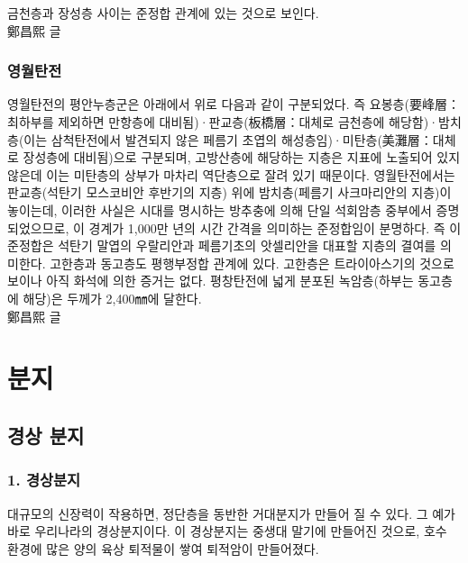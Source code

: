 \documentclass[12pt,a4paper]{book}
\newcommand{\SectionMargin}			{\newpage  \null \vskip 0cm}
\begin{document}
금천층과 장성층 사이는 준정합 관계에 있는 것으로 보인다. \\
\null \hfill 鄭昌熙 글

		\newpage
		\subsection{영월탄전}

영월탄전의 평안누층군은 아래에서 위로 다음과 같이 구분되었다. 즉 요봉층(要峰層：최하부를 제외하면 만항층에 대비됨)·판교층(板橋層：대체로 금천층에 해당함)·밤치층(이는 삼척탄전에서 발견되지 않은 페름기 초엽의 해성층임)·미탄층(美灘層：대체로 장성층에 대비됨)으로 구분되며, 고방산층에 해당하는 지층은 지표에 노출되어 있지 않은데 이는 미탄층의 상부가 마차리 역단층으로 잘려 있기 때문이다. 영월탄전에서는 판교층(석탄기 모스코비안 후반기의 지층) 위에 밤치층(페름기 사크마리안의 지층)이 놓이는데, 이러한 사실은 시대를 명시하는 방추충에 의해 단일 석회암층 중부에서 증명되었으므로, 이 경계가 1,000만 년의 시간 간격을 의미하는 준정합임이 분명하다. 즉 이 준정합은 석탄기 말엽의 우랄리안과 페름기초의 앗셀리안을 대표할 지층의 결여를 의미한다. 고한층과 동고층도 평행부정합 관계에 있다. 고한층은 트라이아스기의 것으로 보이나 아직 화석에 의한 증거는 없다. 평창탄전에 넓게 분포된 녹암층(하부는 동고층에 해당)은 두께가 2,400㎜에 달한다.\\
\null \hfill 鄭昌熙 글

%
%
%
	\newpage
	\chapter{분지}



	\SectionMargin
	\section{경상 분지}
	\null





\subsection*{1. 경상분지}

대규모의 신장력이 작용하면, 정단층을 동반한 거대분지가 만들어 질 수 있다. 그 예가 바로 우리나라의 경상분지이다. 이 경상분지는 중생대 말기에 만들어진 것으로, 호수 환경에 많은 양의 육상 퇴적물이 쌓여 퇴적암이 만들어졌다.
\end{document}
